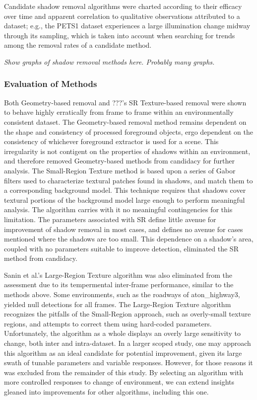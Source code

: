 \documentclass[12pt]{report}
\begin{document}
Candidate shadow removal algorithms were charted according to their efficacy over time and apparent correlation to qualitative observations attributed to a dataset; e.g., the PETS1 dataset experiences a large illumination change midway through its sampling, which is taken into account when searching for trends among the removal rates of a candidate method.

\textit{Show graphs of shadow removal methods here. Probably many graphs.}

\subsubsection{Evaluation of Methods}
Both Geometry-based removal and ???'s SR Texture-based removal were shown to behave highly erratically from frame to frame within an environmentally consistent dataset. The Geometry-based removal method remains dependent on the shape and consistency of processed foreground objects, ergo dependent on the consistency of whichever foreground extractor is used for a scene. This irregularity is not contigent on the properties of shadows within an environment, and therefore removed Geometry-based methods from candidacy for further analysis. The Small-Region Texture method is based upon a series of Gabor filters used to characterize textural patches found in shadows, and match them to a corresponding background model. This technique requires that shadows cover textural portions of the background model large enough to perform meaningful analysis. The algorithm carries with it no meaningful contingencies for this limitation. The parameters associated with SR define little avenue for improvement of shadow removal in most cases, and defines no avenue for cases mentioned where the shadows are too small. This dependence on a shadow's area, coupled with no parameters suitable to improve detection, eliminated the SR method from candidacy. 

Sanin et al.'s Large-Region Texture algorithm was also eliminated from the assessment due to its tempermental inter-frame performance, similar to the methods above. Some environments, such as the roadways of aton\_highway3, yielded null detections for all frames. The Large-Region Texture algorithm recognizes the pitfalls of the Small-Region approach, such as overly-small texture regions, and attempts to correct them using hard-coded parameters. Unfortunately, the algorithm as a whole displays an overly large sensitivity to change, both inter and intra-dataset. In a larger scoped study, one may approach this algorithm as an ideal candidate for potential improvement, given its large swath of tunable parameters and variable responses. However, for those reasons it was excluded from the remainder of this study. By selecting an algorithm with more controlled responses to change of environment, we can extend insights gleaned into improvements for other algorithms, including this one.
\end{document}
